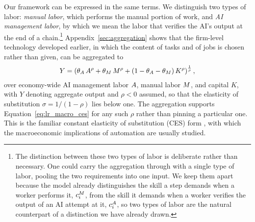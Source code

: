 Our framework can be expressed in the same terms.
We distinguish two types of labor: \emph{manual labor}, which performs the manual portion of work, and \emph{AI management labor}, by which we mean the labor that verifies the AI's output at the end of a chain.\footnote{
The distinction between these two types of labor is deliberate rather than necessary.
One could carry the aggregation through with a single type of labor, pooling the two requirements into one input.
We keep them apart because the model already distinguishes the skill a step demands when a worker performs it, $c^{M}_{i}$, from the skill it demands when a worker verifies the output of an AI attempt at it, $c^{A}_{i}$, so two types of labor are the natural counterpart of a distinction we have already drawn.
}
Appendix~\ref{sec:aggregation} shows that the firm-level technology developed earlier, in which the content of tasks and of jobs is chosen rather than given, can be aggregated to
\begin{align}
\label{eq:lr_macro_ces}
Y = \left(\theta_{A}\,A^{\rho} + \theta_{M}\,M^{\rho} + (1-\theta_{A}-\theta_{M})\,K^{\rho}\right)^{\frac{1}{\rho}},
\end{align}
over economy-wide AI management labor $A$, manual labor $M$, and capital $K$, with $Y$ denoting aggregate output and $\rho < 0$ assumed, so that the elasticity of substitution $\sigma = 1/(1-\rho)$ lies below one.
The aggregation supports Equation~\eqref{eq:lr_macro_ces} for any such $\rho$ rather than pinning a particular one.
This is the familiar constant elasticity of substitution (CES) form \citep{deloecker2021io}, with which the macroeconomic implications of automation are usually studied.

